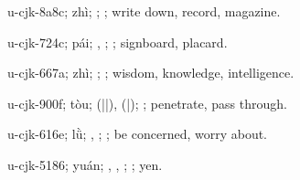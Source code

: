 \begin{multicols}{2}
{\cjkgGlue{}u-cjk-8a8c; zhì; \cjkgGlue{}; \cjkgGlue{}; write down, record, magazine.

\cjkgGlue{}u-cjk-724c; pái; \cjkgGlue{}, \cjkgGlue{}; \cjkgGlue{}; signboard, placard.

\cjkgGlue{}u-cjk-667a; zhì; \cjkgGlue{}; \cjkgGlue{}; wisdom, knowledge, intelligence.

\cjkgGlue{}u-cjk-900f; tòu; \cjkgGlue{}\cjkgGlue{}(\cjkgGlue{}|\cjkgGlue{}|\cjkgGlue{}), \cjkgGlue{}\cjkgGlue{}(\cjkgGlue{}|\cjkgGlue{}); \cjkgGlue{}; penetrate, pass through.

\cjkgGlue{}u-cjk-616e; lǜ; \cjkgGlue{}\cjkgGlue{}\cjkgGlue{}, \cjkgGlue{}\cjkgGlue{}\cjkgGlue{}; \cjkgGlue{}; be concerned, worry about.

\cjkgGlue{}u-cjk-5186; yuán; \cjkgGlue{}\cjkgGlue{}\cjkgGlue{}, \cjkgGlue{}\cjkgGlue{}\cjkgGlue{}, \cjkgGlue{}\cjkgGlue{}\cjkgGlue{}; \cjkgGlue{}; yen.

}
\end{multicols}
